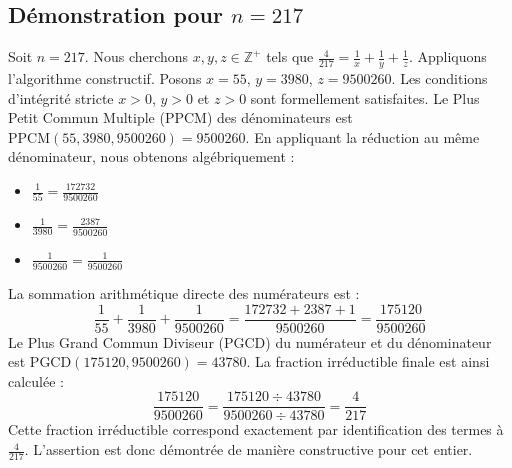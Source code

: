 \documentclass[11pt,a4paper]{article}
\begin{document}
\subsection{Démonstration pour $n = 217$}
Soit $n = 217$. Nous cherchons $x, y, z \in \mathbb{Z}^{+}$ tels que $\frac{4}{217} = \frac{1}{x} + \frac{1}{y} + \frac{1}{z}$.
Appliquons l'algorithme constructif. Posons $x = 55$, $y = 3980$, $z = 9500260$.
Les conditions d'intégrité stricte $x > 0$, $y > 0$ et $z > 0$ sont formellement satisfaites.
Le Plus Petit Commun Multiple (PPCM) des dénominateurs est $\text{PPCM}(55, 3980, 9500260) = 9500260$.
En appliquant la réduction au même dénominateur, nous obtenons algébriquement :
\begin{itemize}
    \item $\frac{1}{55} = \frac{172732}{9500260}$
    \item $\frac{1}{3980} = \frac{2387}{9500260}$
    \item $\frac{1}{9500260} = \frac{1}{9500260}$
\end{itemize}
La sommation arithmétique directe des numérateurs est :
$$ \frac{1}{55} + \frac{1}{3980} + \frac{1}{9500260} = \frac{172732 + 2387 + 1}{9500260} = \frac{175120}{9500260} $$
Le Plus Grand Commun Diviseur (PGCD) du numérateur et du dénominateur est $\text{PGCD}(175120, 9500260) = 43780$.
La fraction irréductible finale est ainsi calculée :
$$ \frac{175120}{9500260} = \frac{175120 \div 43780}{9500260 \div 43780} = \frac{4}{217} $$
Cette fraction irréductible correspond exactement par identification des termes à $\frac{4}{217}$. L'assertion est donc démontrée de manière constructive pour cet entier.
\end{document}
